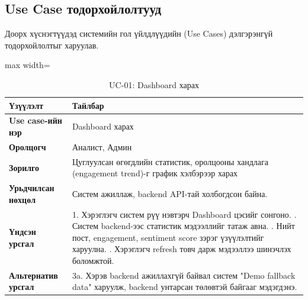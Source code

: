 \subsection{Use Case тодорхойлолтууд}

Доорх хүснэгтүүдэд системийн гол үйлдлүүдийн (Use Cases) дэлгэрэнгүй тодорхойлолтыг харуулав.

\begin{table}[H]
\centering
\caption{UC-01: Dashboard харах}
\small
\begin{adjustbox}{max width=\textwidth}
\begin{tabular}{|p{3cm}|p{10cm}|}
\hline
\rowcolor{gray!20}\textbf{Үзүүлэлт} & \textbf{Тайлбар} \\ \hline
\textbf{Use case-ийн нэр} & Dashboard харах \\ \hline
\textbf{Оролцогч} & Аналист, Админ \\ \hline
\textbf{Зорилго} & Цуглуулсан өгөгдлийн статистик, оролцооны хандлага (engagement trend)-г график хэлбэрээр харах \\ \hline
\textbf{Урьдчилсан нөхцөл} & Систем ажиллаж, backend API-тай холбогдсон байна. \\ \hline
\textbf{Үндсэн урсгал} & 1. Хэрэглэгч систем рүү нэвтэрч Dashboard цэсийг сонгоно. \newline 2. Систем backend-ээс статистик мэдээллийг татаж авна. \newline 3. Нийт пост, engagement, sentiment score зэрэг үзүүлэлтийг харуулна. \newline 4. Хэрэглэгч refresh товч дарж мэдээллээ шинэчлэх боломжтой. \\ \hline
\textbf{Альтернатив урсгал} & 3a. Хэрэв backend ажиллахгүй байвал систем "Demo fallback data" харуулж, backend унтарсан төлөвтэй байгааг мэдэгдэнэ. \\ \hline
\end{tabular}
\end{adjustbox}
\normalsize
\end{table}

